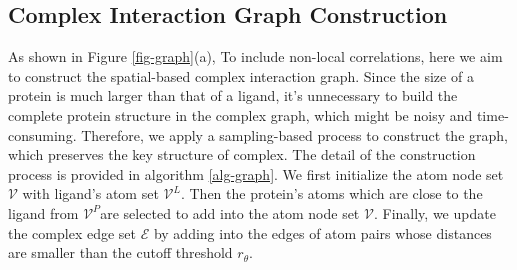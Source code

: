 \documentclass[sigconf]{acmart}
\newcommand{\proteinV}{\ensuremath{\mathcal{V}^P}}
\newcommand{\ligandV}{\ensuremath{\mathcal{V}^L}}
\begin{document}
\subsection{Complex Interaction Graph Construction}
\label{a-graph-constrcut}
As shown in Figure \ref{fig-graph}(a),  To include non-local correlations, here we aim to construct the spatial-based complex interaction graph. Since the size of a protein is much larger than that of a ligand, it's unnecessary to build the complete protein structure in the complex graph, which might be noisy and time-consuming. Therefore, we apply a sampling-based process to construct the graph, which preserves the key structure of complex. The detail of the construction process is provided in algorithm \ref{alg-graph}. We first initialize the atom node set $\mathcal{V}$ with ligand's atom set \ligandV. Then the protein's atoms which are close to the ligand from \proteinV are selected to add into the atom node set $\mathcal{V}$. Finally, we update the complex edge set $\mathcal{E}$ by adding into the edges of atom pairs whose distances are smaller than the cutoff threshold $r_{\theta}$.
\end{document}
